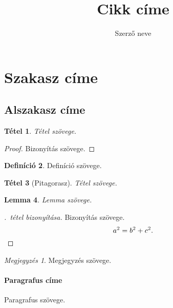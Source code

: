 \documentclass[a4paper,12pt]{article}
\newtheorem{tetel}{Tétel}[section]
\newtheorem{lemma}[tetel]{Lemma}
\theoremstyle{definition}
\newtheorem{definicio}[tetel]{Definíció}
\theoremstyle{remark}
\newtheorem*{megjegyzes}{Megjegyzés}
\begin{document}
\title{Cikk címe}
\author{Szerző neve}
\maketitle

\begin{abstract}
\hulipsum[1]
\end{abstract}

\section{Szakasz címe}
\subsection{Alszakasz címe}
\hulipsum
\begin{tetel}
Tétel szövege.
\end{tetel}

\begin{proof}
Bizonyítás szövege.
\end{proof}

\begin{definicio}
Definíció szövege.
\end{definicio}

\begin{tetel}[Pitagorasz]\label{tetel-Pitagorasz}
Tétel szövege.
\end{tetel}

\begin{lemma}
Lemma szövege.
\end{lemma}

\begin{proof}[\Az{\ref{tetel-Pitagorasz}}.~tétel bizonyítása]
Bizonyítás szövege.
\[
a^2=b^2+c^2.\qedhere
\]
\end{proof}

\begin{megjegyzes}
Megjegyzés szövege.
\end{megjegyzes}

\paragraph{Paragrafus címe} Paragrafus szövege.
\end{document}
